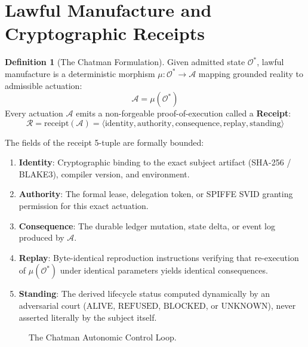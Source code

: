 \documentclass[11pt,twoside,openright]{report}
\theoremstyle{definition}
\newtheorem{definition}{Definition}[chapter]
\theoremstyle{plain}
\theoremstyle{remark}
\begin{document}
\section{Lawful Manufacture and Cryptographic Receipts}

\begin{definition}[The Chatman Formulation]
Given admitted state $\mathcal{O}^*$, lawful manufacture is a deterministic morphism $\mu: \mathcal{O}^* \to \mathcal{A}$ mapping grounded reality to admissible actuation:
\begin{equation}
\mathcal{A} = \mu(\mathcal{O}^*)
\end{equation}
Every actuation $\mathcal{A}$ emits a non-forgeable proof-of-execution called a \textbf{Receipt}:
\begin{equation}
\mathcal{R} = \mathrm{receipt}(\mathcal{A}) = \langle \mathrm{identity}, \mathrm{authority}, \mathrm{consequence}, \mathrm{replay}, \mathrm{standing} \rangle
\end{equation}
\end{definition}

The fields of the receipt 5-tuple are formally bounded:
\begin{enumerate}
    \item \textbf{Identity}: Cryptographic binding to the exact subject artifact (SHA-256 / BLAKE3), compiler version, and environment.
    \item \textbf{Authority}: The formal lease, delegation token, or SPIFFE SVID granting permission for this exact actuation.
    \item \textbf{Consequence}: The durable ledger mutation, state delta, or event log produced by $\mathcal{A}$.
    \item \textbf{Replay}: Byte-identical reproduction instructions verifying that re-execution of $\mu(\mathcal{O}^*)$ under identical parameters yields identical consequences.
    \item \textbf{Standing}: The derived lifecycle status computed dynamically by an adversarial court ($\mathrm{ALIVE}$, $\mathrm{REFUSED}$, $\mathrm{BLOCKED}$, or $\mathrm{UNKNOWN}$), never asserted literally by the subject itself.
\end{enumerate}

\begin{figure}[htbp]
\centering
{}
\caption{The Chatman Autonomic Control Loop.}
\label{fig:chatman_loop}
\end{figure}
\end{document}
